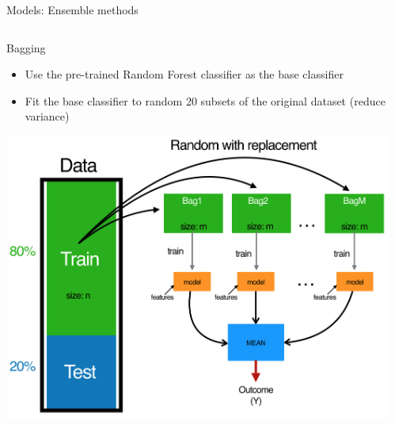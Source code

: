 \documentclass{if-beamer}
\begin{document}
\begin{frame}{Models:  Ensemble methods} 

  \begin{columns}
   \begin{column}{0.5\textwidth} 
   \begin{exampleblock}{Bagging}
   \begin{itemize}
   
   \item  Use the pre-trained Random Forest classifier as the base classifier
   \item Fit the  base classifier to random 20 subsets of the original dataset (reduce variance)
      \end{itemize}
      \end{exampleblock}
      
   \includegraphics[scale=0.15]{./figs/bagging.png} 

   \end{column} 
    
   \begin{column}{0.5\textwidth}
 

\end{column}
\end{columns}
\end{frame}
\end{document}
